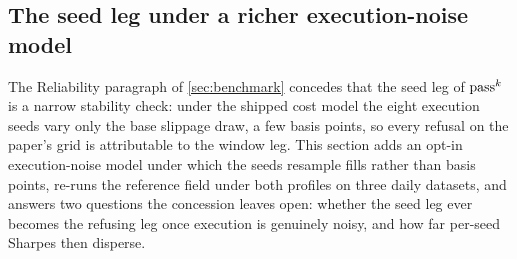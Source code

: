 
\subsection{The seed leg under a richer execution-noise model}\label{sec:seedleg}

The Reliability paragraph of \cref{sec:benchmark} concedes that the seed leg of $\text{pass}^{k}$ is a narrow stability check: under the shipped cost model the eight execution seeds vary only the base slippage draw, a few basis points, so every refusal on the paper's grid is attributable to the window leg. This section adds an opt-in execution-noise model under which the seeds resample fills rather than basis points, re-runs the reference field under both profiles on three daily datasets, and answers two questions the concession leaves open: whether the seed leg ever becomes the refusing leg once execution is genuinely noisy, and how far per-seed Sharpes then disperse.

